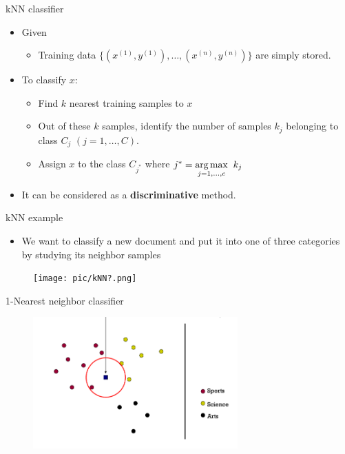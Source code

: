 \documentclass[serif, aspectratio=169]{beamer}
\begin{document}
\begin{frame}{kNN classifier}
    \begin{itemize}
        \item Given
            \begin{itemize}
                \item Training data $\{(x^{(1)}, y^{(1)}), \dots, (x^{(n)}, y^{(n)})\}$ are simply stored.
            \end{itemize}
        \item To classify $x$:
            \begin{itemize}
                \item Find $k$ nearest training samples to $x$
                \item Out of these $k$ samples, identify the number of samples $k_j$ belonging to class $C_j$ $(j=1, \dots, C)$.
                \item Assign $x$ to the class $C_{j^*}$ where $j^*=\underset{j=1,\dots, c}{\arg\max} \hspace{0.2cm} k_j$
            \end{itemize}
        \item It can be considered as a \textbf{discriminative} method.
    \end{itemize}
\end{frame}
\begin{frame}{kNN example}
    \begin{itemize}
        \item We want to classify a new document and put it into one of three categories by studying its neighbor samples
    \end{itemize}
    \begin{figure}[h]
            \centering
            
            \texttt{[image: pic/kNN?.png]}
            \end{figure}
\end{frame}
\begin{frame}{1-Nearest neighbor classifier}
    \begin{figure}[h]
            \centering
            
            \includegraphics[width=0.7\textwidth]{pic/1NN.png}
            \end{figure}
\end{frame}
\end{document}
